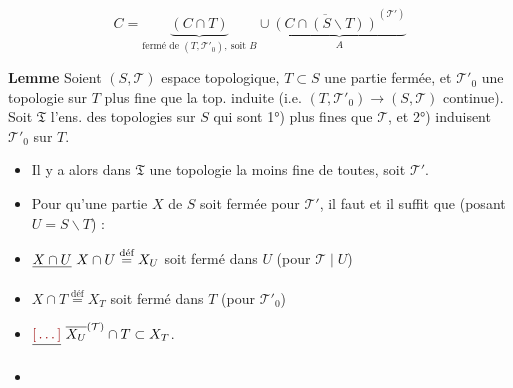 \documentclass[11pt,a4paper]{article}
\begin{document}
\[
  C = \underbrace{(C \cap T)}_{\text{fermé de } (T, \mathcal{T}'_{0}),\ \text{soit } B} \cup \underbrace{\overline{(C \cap (S \smallsetminus T))}^{(\mathcal{T}')}}_{A}
\]
 

\textbf{Lemme} Soient $(S, \mathcal{T})$ espace topologique, $T \subset S$ une partie fermée, et $\mathcal{T}'_{0}$ une topologie sur $T$ plus fine que la top. induite (i.e. $(T, \mathcal{T}'_{0}) \to (S, \mathcal{T})$ continue).   Soit $\mathfrak{T}$ l'ens. des topologies sur $S$ qui sont 1°) plus fines que $\mathcal{T}$, et 2°) induisent $\mathcal{T}'_{0}$ sur $T$.
\begin{itemize}
  \item[(a)] Il y a alors dans $\mathfrak{T}$ une topologie la moins fine de toutes, soit $\mathcal{T}'$.
  \item[(b)] Pour qu'une partie $X$ de $S$ soit fermée pour $\mathcal{T}'$, il faut et il suffit que (posant $U = S \smallsetminus T$) :
  \item[1°)] $\struck{X \cap U} \ X \cap U \overset{\text{déf}}{=} X_{U}$ soit fermé dans $U$ (pour $\mathcal{T} \mid U$)
  \item[2°)] $X \cap T \overset{\text{déf}}{=} X_{T}$ soit fermé dans $T$ (pour $\mathcal{T}'_{0}$)
  \item[3°)] $\struck{\ill{}} \ \overline{X_{U}}^{(\mathcal{T})} \cap T \subset X_{T}$.
  \item[(c)] 
\end{itemize}
\end{document}
